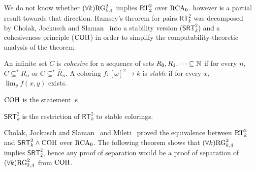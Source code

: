 We do not know whether $(\forall k)\mathrm{RG}^2_{k,4}$ implies $\mathrm{RT}^{2}_{2}$ over $\mathrm{RCA}_0$.  however is a partial result towards that direction. Ramsey's theorem for pairs $\mathsf{RT}^2_k$ was decomposed by Cholak, Jockusch and Slaman~\cite{Cholak2001strength} into a stability version ($\mathsf{SRT}^2_k$) and a cohesiveness principle ($\mathrm{COH}$) in order to simplify the computability-theoretic analysis of the theorem.

\begin{definition}
An infinite set $C$ is \emph{cohesive} for a sequence of sets $R_0, R_1, \dots \subseteq \mathbb{N}$ if for every $n$, $C \subseteq^{*} R_n$ or $C \subseteq^{*} \overline{R}_n$. A coloring $f: [\omega]^2 \to k$ is \emph{stable} if for every $x$, $\lim_y f(x, y)$ exists.
\end{definition}

\begin{statement}[Cohesiveness]
$\mathrm{COH}$ is the statement .s
\end{statement}

\begin{statement}
$\mathsf{SRT}^2_k$ is the restriction of $\mathsf{RT}^2_k$ to stable colorings.
\end{statement}

Cholak, Jockusch and Slaman~\cite[Lemma 7.11]{Cholak2001strength} and Mileti~\cite[Corollary A.1.4]{Mileti2004Partition} proved the equivalence between $\mathrm{RT}^{2}_{k}$ and $\mathsf{SRT}^2_k \wedge \mathrm{COH}$ over $\mathrm{RCA}_0$.
The following theorem shows that  $(\forall k)\mathrm{RG}^2_{k,4}$ implies $\mathsf{SRT}^2_2$, hence any proof of separation would be a proof of separation of  $(\forall k)\mathrm{RG}^2_{k,4}$ from $\mathrm{COH}$. 

